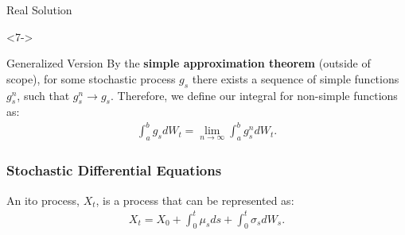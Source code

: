 \documentclass[10pt]{beamer}
\begin{document}
\begin{frame}[t]
\begin{onlyenv}
\begin{block}{Real Solution}
      \end{block}
  \end{onlyenv}
  \begin{onlyenv}<7->
    \begin{block}{Generalized Version}
      By the \textbf{simple approximation theorem} (outside of scope), for some stochastic process $g_s$ there exists a sequence of simple functions $g_{s}^{n}$, such that $g_{s}^{n} \to g_{s}$. Therefore, we define our integral for non-simple functions as:
      \begin{align*}
        \displaystyle\int_{a}^{b}g_{s} dW_t = \lim\limits_{n \to \infty}\displaystyle\int_{a}^{b} g_{s}^{n}dW_t.
      \end{align*}
    \end{block}
  \end{onlyenv}
\end{frame}

\begin{frame}[t]
  \frametitle{Stochastic Differential Equations}
  \begin{definition}
    An ito process, $X_t$, is a process that can be represented as:
    \begin{align*}
      X_t = X_0 + \displaystyle\int_{0}^{t}\mu_s ds + \displaystyle\int_{0}^{t}\sigma_s dW_s.
    \end{align*}
  \end{definition}
\end{frame}
\end{document}
